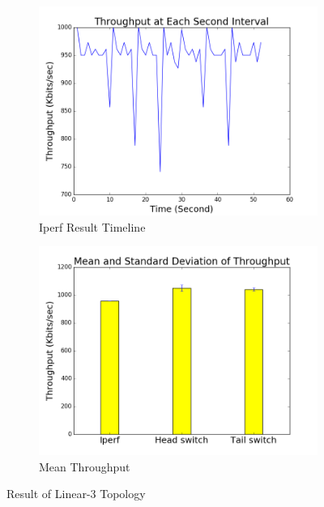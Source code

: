 \documentclass[12pt]{article}
\begin{document}
\begin{figure}
\centering
\begin{subfigure}{.5\textwidth}
  \centering
  \includegraphics[width=.9\linewidth]{544_data/544_linear_5/timeline.png}
  \caption{Iperf Result Timeline}
  \label{fig:first_a}
\end{subfigure}%
\begin{subfigure}{.5\textwidth}
  \centering
  \includegraphics[width=.9\linewidth]{544_data/544_linear_5/bar.png}
  \caption{Mean Throughput}
  \label{fig:first_b}
\end{subfigure}
\caption{Result of Linear-3 Topology}
\label{fig:first}
\end{figure}
\end{document}
